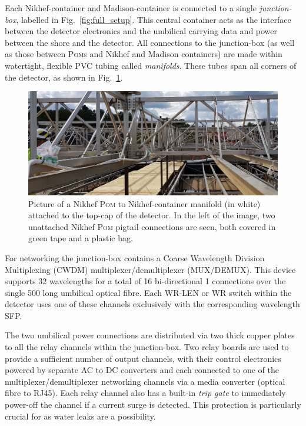 Each Nikhef-container and Madison-container is connected to a single \emph{junction-box}, labelled
in Fig.~\ref{fig:full_setup}. This central container acts as the interface between the detector
electronics and the umbilical carrying data and power between the shore and the detector. All
connections to the junction-box (as well as those between \textsc{Pom}s and Nikhef and Madison
containers) are made within watertight, flexible PVC tubing called \emph{manifolds}. These tubes
span all corners of the \chipsfive detector, as shown in Fig.~\ref{fig:manifold}.

\begin{figure} %
    \includegraphics[width=\textwidth]{diagrams/5-daq/manifold.pdf}
    \caption[Picture of a manifold connection within the \chipsfive detector]
    {Picture of a Nikhef \textsc{Pom} to Nikhef-container manifold (in white) attached to the
        top-cap of the \chipsfive detector. In the left of the image, two unattached Nikhef
        \textsc{Pom} pigtail connections are seen, both covered in green tape and a plastic bag.}
    \label{fig:manifold}
\end{figure}

For networking the junction-box contains a Coarse Wavelength Division Multiplexing (CWDM)
multiplexer/demultiplexer (MUX/DEMUX). This device supports 32 wavelengths for a total of 16
bi-directional \unit{1}{} connections over the single \unit{500}{} long umbilical
optical fibre. Each WR-LEN or WR switch within the detector uses one of these channels exclusively
with the corresponding wavelength SFP.

The two umbilical power connections are distributed via two thick copper plates to all the relay
channels within the junction-box. Two relay boards are used to provide a sufficient number of
output channels, with their control electronics powered by separate AC to DC converters and each
connected to one of the multiplexer/demultiplexer networking channels via a media converter
(optical fibre to RJ45). Each relay channel also has a built-in \emph{trip gate} to immediately
power-off the channel if a current surge is detected. This protection is particularly crucial for
\chipsfive as water leaks are a possibility.

